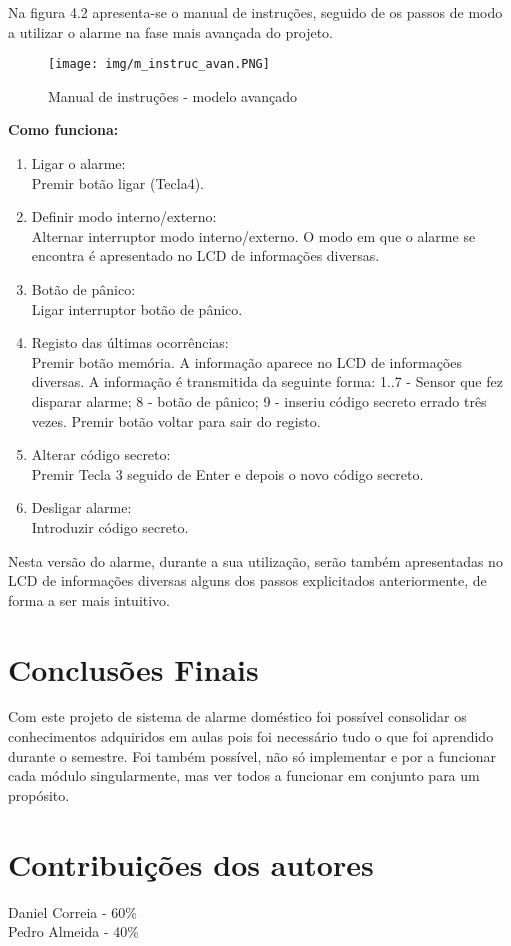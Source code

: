 \documentclass{report}
\begin{document}
	
	
	 Na figura 4.2 apresenta-se o manual de instruções, seguido de os passos de modo a utilizar o alarme na fase mais avançada do projeto.
	
	\begin{figure} [h]
		\centering
		\texttt{[image: img/m\_instruc\_avan.PNG]}
		\caption{Manual de instruções - modelo avançado}
	\end{figure}
	
\newpage

	\textbf{Como funciona:}
	\begin{enumerate}
 		\item Ligar o alarme:\\
 		Premir botão ligar (Tecla4).
 		
 		\item Definir modo interno/externo:\\
 		Alternar interruptor modo interno/externo. O modo em que o alarme                    	    se encontra é apresentado no LCD de informações diversas.
 		
 		\item Botão de pânico:\\
 		Ligar interruptor botão de pânico. 
 		
 		\item Registo das últimas ocorrências:\\
 		Premir botão memória. A informação aparece no LCD de informações 			diversas. 
 		A informação é transmitida da seguinte forma:
 		1..7 - Sensor que fez disparar alarme;
 		8 - botão de pânico;
 		9 - inseriu código secreto errado três vezes.
 		Premir botão voltar para sair do registo.
 		
 		\item Alterar código secreto:\\
 		Premir Tecla 3 seguido de Enter e depois o novo código secreto.
 		
 		\item Desligar alarme:\\
 		Introduzir código secreto. 		
	\end{enumerate}
	
	
	Nesta versão do alarme, durante a sua utilização, serão também apresentadas no LCD de informações diversas alguns dos passos explicitados anteriormente, de forma a ser mais intuitivo.
	
	 

	
\chapter{Conclusões Finais}
\label{chap.conclusao}
	Com este projeto de sistema de alarme doméstico foi possível consolidar os conhecimentos adquiridos em aulas pois foi necessário tudo o que foi aprendido durante o semestre. 
	Foi também possível, não só implementar e por a funcionar cada módulo singularmente, mas ver todos a funcionar em conjunto para um propósito. 

 
\chapter{Contribuições dos autores}
\label{contribuições}

\noindent
Daniel Correia - 60\% \\
Pedro Almeida - 40\%
\end{document}

